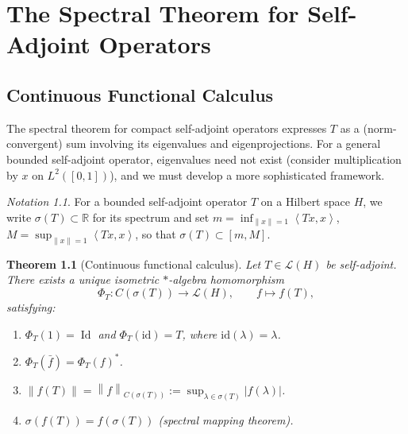 \documentclass[a4paper,12pt]{book}
\DeclareMathOperator{\Id}{Id}
\newcommand{\R}{\mathbb{R}}
\newcommand{\norm}[1]{\left\| #1 \right\|}
\newcommand{\abs}[1]{\left| #1 \right|}
\newcommand{\inner}[2]{\left\langle #1, #2 \right\rangle}
\theoremstyle{definition}
\theoremstyle{plain}
\newtheorem{theorem}[definition]{Theorem}
\theoremstyle{remark}
\newtheorem{notation}[definition]{Notation}
\begin{document}
\chapter{The Spectral Theorem for Self-Adjoint Operators}
\label{ch:spectral-thm}
\minitoc

\section{Continuous Functional Calculus}\label{sec:cont-func-calc}


The spectral theorem for compact self-adjoint operators expresses $T$ as a
(norm-convergent) sum involving its eigenvalues and eigenprojections. For a
general bounded self-adjoint operator, eigenvalues need not exist (consider
multiplication by $x$ on $L^2([0,1])$), and we must develop a more sophisticated
framework.

\begin{notation}\label{not:spectrum-sa}
For a bounded self-adjoint operator $T$ on a Hilbert space $H$, we write
$\sigma(T) \subset \R$ for its spectrum and set
$m = \inf_{\norm{x}=1}\inner{Tx}{x}$, $M = \sup_{\norm{x}=1}\inner{Tx}{x}$,
so that $\sigma(T) \subset [m, M]$.
\end{notation}

\begin{theorem}[Continuous functional calculus]\label{thm:cont-func-calc}
Let $T \in \mathcal{L}(H)$ be self-adjoint. There exists a unique isometric
$*$-algebra homomorphism
\[
  \Phi_T \colon C(\sigma(T)) \longrightarrow \mathcal{L}(H),
  \qquad f \longmapsto f(T),
\]
satisfying:
\begin{enumerate}[label=(\roman*)]
  \item $\Phi_T(1) = \Id$ and $\Phi_T(\mathrm{id}) = T$,
        where $\mathrm{id}(\lambda) = \lambda$.
  \item $\Phi_T(\bar{f}) = \Phi_T(f)^*$.
  \item $\norm{f(T)} = \norm{f}_{C(\sigma(T))} := \sup_{\lambda \in \sigma(T)} \abs{f(\lambda)}$.
  \item $\sigma(f(T)) = f(\sigma(T))$ (spectral mapping theorem).
\end{enumerate}
\end{theorem}
\end{document}
